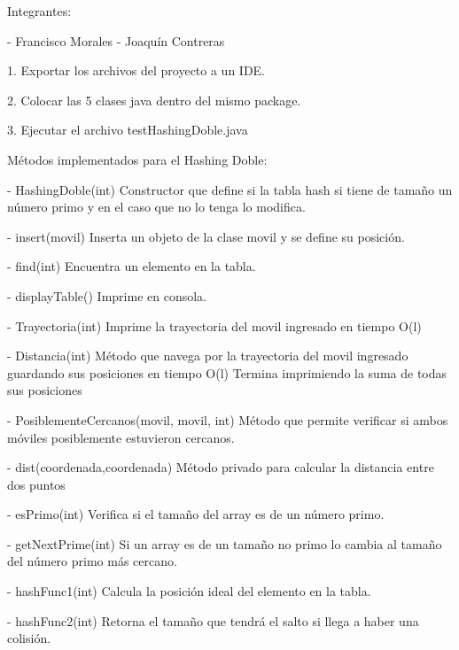 Integrantes:

- Francisco Morales
- Joaquín Contreras

1. Exportar los archivos del proyecto a un IDE.

2. Colocar las 5 clases java dentro del mismo package.

3. Ejecutar el archivo testHashingDoble.java

Métodos implementados para el Hashing Doble:

- HashingDoble(int)	                        Constructor que define si la tabla hash si tiene de tamaño un número primo
                                                y en el caso que no lo tenga lo modifica.

- insert(movil) 	                              Inserta un objeto de la clase movil y se define su posición.

- find(int) 		                        Encuentra un elemento en la tabla.

- displayTable()	                              Imprime en consola.

- Trayectoria(int)	                        Imprime la trayectoria del movil ingresado en tiempo O(l)

- Distancia(int)                                Método que navega por la trayectoria del movil ingresado guardando sus
                                                posiciones en tiempo O(l)
                                                Termina imprimiendo la suma de todas sus posiciones

- PosiblementeCercanos(movil, movil, int)       Método que permite verificar si ambos móviles posiblemente estuvieron cercanos.        

- dist(coordenada,coordenada)                   Método privado para calcular la distancia entre dos puntos

- esPrimo(int)   	                              Verifica si el tamaño del array es de un número primo.

- getNextPrime(int) 	                        Si un array es de un tamaño no primo lo cambia al tamaño del número primo más cercano.

- hashFunc1(int)	                              Calcula la posición ideal del elemento en la tabla.

- hashFunc2(int)	                              Retorna el tamaño que tendrá el salto si llega a haber una colisión.